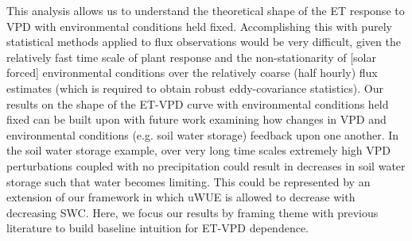 This analysis allows us to understand the theoretical shape of the ET
response to VPD with environmental conditions held
fixed. Accomplishing this with purely statistical methods applied to
flux observations would be very difficult, given the relatively fast
time scale of plant response and the non-stationarity of [solar
forced] environmental conditions over the relatively coarse (half
hourly) flux estimates (which is required to obtain robust
eddy-covariance statistics). Our results on the shape of the ET-VPD
curve with environmental conditions held fixed can be built upon with
future work examining how changes in VPD and environmental conditions
(e.g. soil water storage) feedback upon one another. In the soil water
storage example, over very long time scales extremely high VPD
perturbations coupled with no precipitation could result in decreases
in soil water storage such that water becomes limiting. This could be
represented by an extension of our framework in which uWUE is allowed
to decrease with decreasing SWC. Here, we focus our results by
framing theme with previous literature to  build baseline intuition for
ET-VPD dependence.
